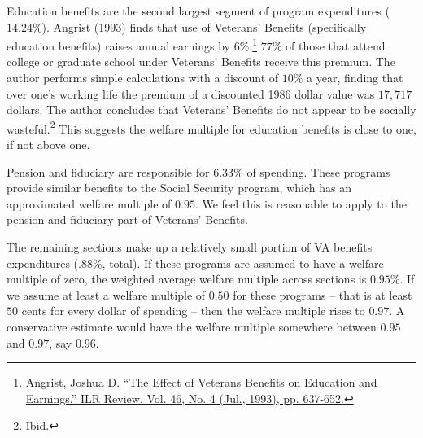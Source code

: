 \documentclass{article}
\begin{document}
Education benefits are the second largest segment of program expenditures ($14.24\%$). Angrist (1993) finds that use of Veterans' Benefits (specifically education benefits) raises annual earnings by $6\%$.\footnote{\href{http://www.jstor.org/stable/2524309}{Angrist, Joshua D. “The Effect of Veterans Benefits on Education and Earnings.” ILR Review. Vol. 46, No. 4 (Jul., 1993), pp. 637-652.}} $77\%$ of those that attend college or graduate school under Veterans' Benefits receive this premium. The author performs simple calculations with a discount of $10\%$ a year, finding that over one's working life the premium of a discounted 1986 dollar value was $17,717$ dollars. The author concludes that Veterans' Benefits do not appear to be socially wasteful.\footnote{Ibid.} This suggests the welfare multiple for education benefits is close to one, if not above one.

Pension and fiduciary are responsible for $6.33\%$ of spending. These programs provide similar benefits to the Social Security program, which has an approximated welfare multiple of $0.95$. We feel this is reasonable to apply to the pension and fiduciary part of Veterans' Benefits.

The remaining sections make up a relatively small portion of VA benefits expenditures ($.88\%$, total). If these programs are assumed to have a welfare multiple of zero, the weighted average welfare multiple across sections is $0.95\%$. If we assume at least a welfare multiple of $0.50$ for these programs -- that is at least $50$ cents for every dollar of spending -- then the welfare multiple rises to $0.97$. A conservative estimate would have the welfare multiple somewhere between $0.95$ and $0.97$, say $0.96$.
\end{document}
